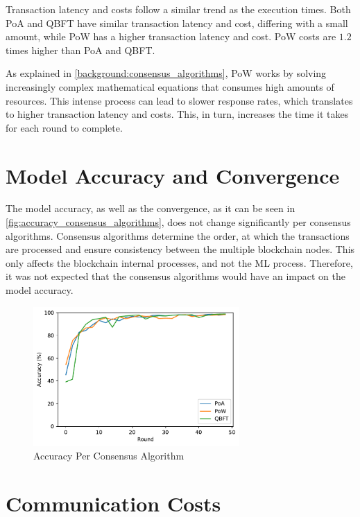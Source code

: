 Transaction latency and costs follow a similar trend as the execution times. Both PoA and QBFT have similar transaction latency and cost, differing with a small amount, while PoW has a higher transaction latency and cost. PoW costs are $1.2$ times higher than PoA and QBFT.

As explained in \autoref{background:consensus_algorithms}, PoW works by solving increasingly complex mathematical equations that consumes high amounts of resources. This intense process can lead to slower response rates, which translates to higher transaction latency and costs. This, in turn, increases the time it takes for each round to complete.

\section{Model Accuracy and Convergence}

The model accuracy, as well as the convergence, as it can be seen in \autoref{fig:accuracy_consensus_algorithms}, does not change significantly per consensus algorithms. Consensus algorithms determine the order, at which the transactions are processed and ensure consistency between the multiple blockchain nodes. This only affects the blockchain internal processes, and not the ML process. Therefore, it was not expected that the consensus algorithms would have an impact on the model accuracy.

\begin{figure}[!ht]
    \centering
    \centering
    \includegraphics[width=0.7\textwidth]{graphics/consensus/accuracy.pdf}
    \caption{Accuracy Per Consensus Algorithm}
    \label{fig:accuracy_consensus_algorithms}
\end{figure}

\section{Communication Costs}

